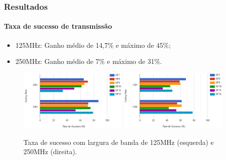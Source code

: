 \documentclass[aspectratio=169]{beamer}
\begin{document}
\begin{frame}

\frametitle{Resultados}
\framesubtitle{Taxa de sucesso de transmissão}

\begin{itemize}
    \item 125MHz: Ganho médio de 14,7\% e máximo de 45\%;
    \item 250MHz: Ganho médio de 7\% e máximo de 31\%.
\end{itemize}

\begin{figure}
  \centering
  \includegraphics[width=0.475\textwidth]{img/CR125.png}
  \hfill
  \includegraphics[width=0.475\textwidth]{img/CR250.png}
  \caption{Taxa de sucesso com largura de banda de 125MHz (esquerda) e 250MHz (direita).}
\end{figure}

\end{frame}
\end{document}
